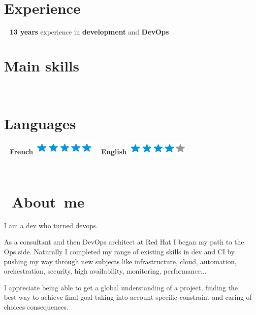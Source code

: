 \documentclass[]{friggeri-cv}
\begin{document}
\begin{aside}
    \section{Experience}
    ~
    	\textbf{13 years} experience in 	\textbf{development} and 	\textbf{DevOps}
    	~
    	~
    \section{Main skills}
    ~
    ~
    ~
    ~
    ~
    \section{Languages}
    ~
    \textbf{French}\includegraphics[scale=0.40]{img/5stars.png}
    ~
    \textbf{English}\includegraphics[scale=0.40]{img/4stars.png}
    ~    
\end{aside}
~
\newlength{\parsepsave}
\section{\ About\ me} 
 \qquad I am a dev who turned devops. 
 
 \vspace{-4pt}
 \qquad  As a consultant and then DevOps architect at Red Hat I began my path to the Ops side. Naturally I completed my range of existing skills in dev and CI by pushing my way through new subjects like infrastructure, cloud, automation, orchestration, security, high availability, monitoring, performance...
 
 \vspace{-4pt}
 \qquad   I appreciate being able to get a global understanding of a project, finding the best way to achieve final goal taking into account specific constraint and caring of choices consequences. 
 
\end{document}
